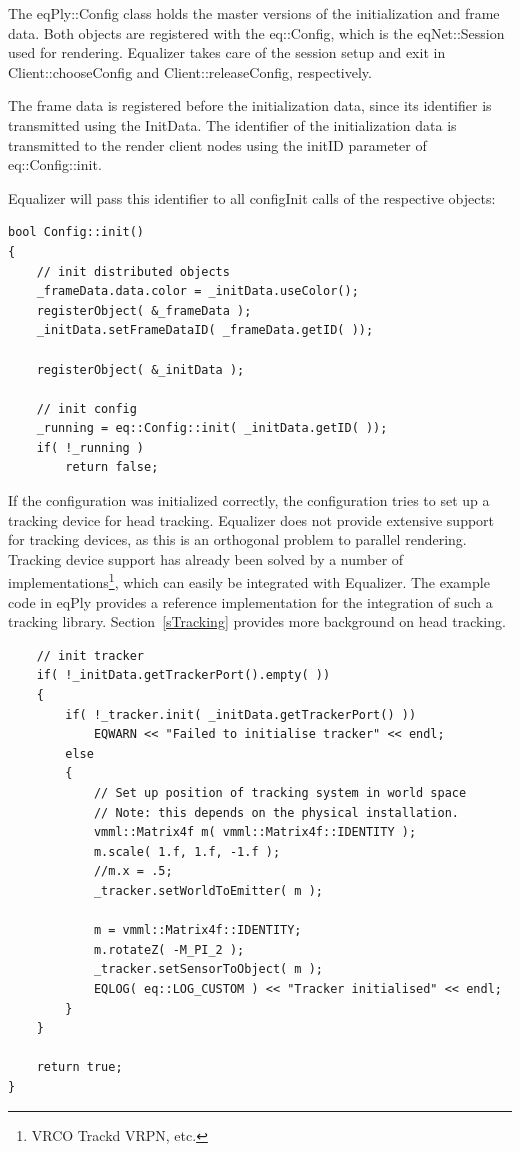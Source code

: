 \documentclass[10pt,a4]{scrartcl}
\newcommand{\sref}[1]{Section~\ref{#1}}
\begin{document}
The \textsf{eqPly::Config} class holds the master versions of the
initialization and frame data. Both objects are registered with the
\textsf{eq::Config}, which is the \textsf{eqNet::Session} used for
rendering. Equalizer takes care of the session setup and exit in
\textsf{Client::choose\-Config} and \textsf{Client::releaseConfig},
respectively.

The frame data is registered before the initialization data, since its
identifier is transmitted using the \textsf{InitData}. The identifier of
the initialization data is transmitted to the render client nodes using
the \textsf{initID} parameter of \textsf{eq::Config::init}.

Equalizer will pass this identifier to all \textsf{configInit} calls of
the respective objects:

{\footnotesize\begin{lstlisting}
bool Config::init()
{
    // init distributed objects
    _frameData.data.color = _initData.useColor();
    registerObject( &_frameData );
    _initData.setFrameDataID( _frameData.getID( ));

    registerObject( &_initData );

    // init config
    _running = eq::Config::init( _initData.getID( ));
    if( !_running )
        return false;
\end{lstlisting}}

If the configuration was initialized correctly, the configuration tries
to set up a tracking device for head tracking. Equalizer does not
provide extensive support for tracking devices, as this is an orthogonal
problem to parallel rendering. Tracking device support has already been
solved by a number of implementations\footnote{VRCO Trackd VRPN, etc.},
which can easily be integrated with Equalizer. The example code in
\textsf{eqPly} provides a reference implementation for the integration
of such a tracking library. \sref{sTracking} provides more background on
head tracking.

{\footnotesize\begin{lstlisting}
    // init tracker
    if( !_initData.getTrackerPort().empty( ))
    {
        if( !_tracker.init( _initData.getTrackerPort() ))
            EQWARN << "Failed to initialise tracker" << endl;
        else
        {
            // Set up position of tracking system in world space
            // Note: this depends on the physical installation.
            vmml::Matrix4f m( vmml::Matrix4f::IDENTITY );
            m.scale( 1.f, 1.f, -1.f );
            //m.x = .5;
            _tracker.setWorldToEmitter( m );

            m = vmml::Matrix4f::IDENTITY;
            m.rotateZ( -M_PI_2 );
            _tracker.setSensorToObject( m );
            EQLOG( eq::LOG_CUSTOM ) << "Tracker initialised" << endl;
        }
    }

    return true;
}
\end{lstlisting}}%
\end{document}
